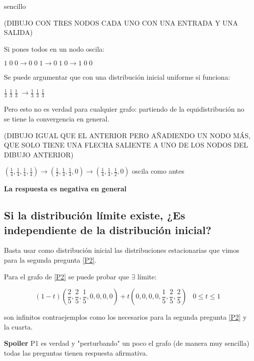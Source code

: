 \begin{example}{sencillo}

	(DIBUJO CON TRES NODOS CADA UNO CON UNA ENTRADA Y UNA SALIDA)

	Si pones todos en un nodo oscila:

	$1\; 0\; 0 \rightarrow 0\; 0\; 1 \rightarrow 0\; 1\; 0 \rightarrow 1\; 0\; 0$

	Se puede argumentar que con una distribución inicial uniforme si funciona:

	$\frac{1}{3} \; \frac{1}{3} \; \frac{1}{3} \; \rightarrow \frac{1}{3} \; \frac{1}{3} \; \frac{1}{3} \; $

	Pero esto no es verdad para cualquier grafo: partiendo de la equidistribución no se tiene la convergencia en general.

	(DIBUJO IGUAL QUE EL ANTERIOR PERO AÑADIENDO UN NODO MÁS, QUE SOLO TIENE UNA FLECHA SALIENTE A UNO DE LOS NODOS DEL DIBUJO ANTERIOR)

	$(\frac{1}{4},\frac{1}{4},\frac{1}{4},\frac{1}{4}) \rightarrow (\frac{1}{2},\frac{1}{4},\frac{1}{4}, 0) \rightarrow (\frac{1}{4},\frac{1}{4},\frac{1}{2},0)$ oscila como antes

	\textbf{La respuesta es negativa en general}

\end{example}


\subsection {Si la distribución límite existe, ¿Es independiente de la distribución inicial?}


Basta usar como distribución inicial las distribuciones estacionarias que vimos para la segunda pregunta \ref{P2}.

\begin{obs} 

Para el grafo de \ref{P2} se puede probar que $\exists$ límite:

$$(1-t)(\frac{2}{5},\frac{2}{5},\frac{1}{5},0,0,0,0) + t (0,0,0,0,\frac{1}{5},\frac{2}{5},\frac{2}{5}) \;\;\; 0 \leq t \leq 1 $$

son infinitos contraejemplos como los necesarios para la segunda pregunta \ref{P2} y la cuarta.

\end{obs}


\textbf{Spoiler} P1 es verdad y "perturbando" un poco el grafo (de manera muy sencilla) todas las preguntas tienen respuesta afirmativa.




